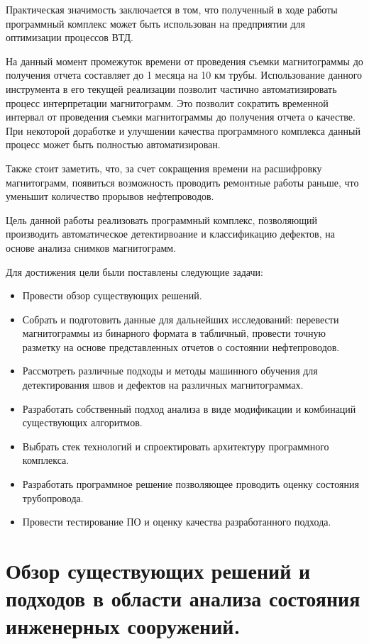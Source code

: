 \documentclass[a4paper,article,14pt]{extarticle}
\begin{document}
Практическая значимость заключается в том, что полученный в ходе работы программный комплекс может быть 
использован на предприятии для оптимизации процессов ВТД. 

На данный момент промежуток времени от проведения съемки магнитограммы до получения отчета составляет 
до 1 месяца на 10 км трубы. Использование данного инструмента в его текущей реализации позволит частично 
автоматизировать процесс интерпретации магнитограмм. Это позволит сократить временной интервал от проведения 
съемки магнитограммы до получения отчета о качестве. При некоторой доработке и улучшении качества программного 
комплекса данный процесс может быть полностью автоматизирован.

Также стоит заметить, что, за счет сокращения времени на расшифровку магнитограмм, появиться возможность 
проводить ремонтные работы раньше, что уменьшит количество прорывов нефтепроводов.


\pagebreak
{}
Цель данной работы реализовать программный комплекс, позволяющий производить автоматическое детектирвоание и классификацию дефектов, на основе анализа снимков магнитограмм. 

Для достижения цели были поставлены следующие задачи:

\begin{itemize}
    \item Провести обзор существующих решений.
    \item Собрать и подготовить данные для дальнейших исследований: перевести магнитограммы из бинарного формата в табличный, 
    провести точную разметку на основе представленных отчетов о состоянии нефтепроводов.
    \item Рассмотреть различные подходы и методы машинного обучения для детектирования швов и дефектов на различных магнитограммах.
    \item Разработать собственный подход анализа в виде модификации и комбинаций существующих алгоритмов.
    \item Выбрать стек технологий и спроектировать архитектуру программного комплекса.
    \item Разработать программное решение позволяющее проводить оценку состояния трубопровода.
    \item Провести тестирование ПО и оценку качества разработанного подхода.
\end{itemize}

\pagebreak
\section{Обзор существующих решений и подходов в области анализа состояния инженерных сооружений.}
\end{document}
